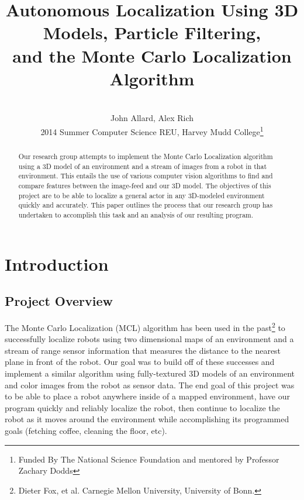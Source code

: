 \documentclass[a4paper,11pt]{article}
\title{Autonomous Localization Using 3D Models, Particle Filtering, \\ and the Monte Carlo Localization Algorithm}
\author{ \\[7in]  John Allard, Alex Rich \\ 2014 Summer Computer Science REU, Harvey Mudd College\thanks{Funded By The National Science Foundation and mentored by Professor Zachary Dodds}}
\begin{document}
  \maketitle   
  \newpage  
  
  \tableofcontents
  
  \newpage

  \begin{abstract}  
  Our research group attempts to implement the Monte Carlo Localization algorithm using a 3D model of an environment and a stream of images from a robot in that environment. This entails the use of various computer vision algorithms to find and compare features between the image-feed and our 3D model. The objectives of this project are to be able to localize a general actor in any 3D-modeled environment quickly and accurately. This paper outlines the process that our research group has undertaken to accomplish this task and an analysis of our resulting program. 
  \end{abstract}
  









  \section{Introduction} 

\subsection{Project Overview}
The Monte Carlo Localization (MCL) algorithm has been used in the past\footnote{ Dieter Fox, et al. Carnegie Mellon University, University of Bonn.} to successfully localize robots using two dimensional maps of an environment and a stream of range sensor information that measures the distance to the nearest plane in front of the robot. Our goal was to build off of these successes and implement a similar algorithm using fully-textured 3D models of an environment and color images from the robot as sensor data. The end goal of this project was to be able to place a robot anywhere inside of a mapped environment, have our program quickly and reliably localize the robot, then continue to localize the robot as it moves around the environment while accomplishing its programmed goals (fetching coffee, cleaning the floor, etc).
\end{document}
